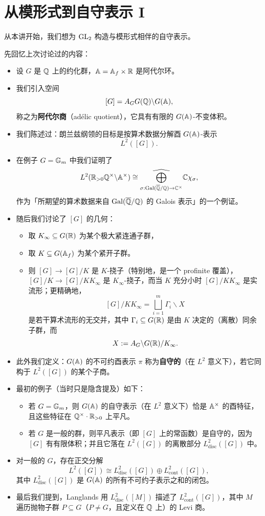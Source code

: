 \chapter{从模形式到自守表示 I}

从本讲开始，我们想为 $\operatorname{GL}_2$ 构造与模形式相伴的自守表示。

先回忆上次讨论过的内容：
\begin{itemize}
\item 设 $G$ 是 $\mathbb{Q}$ 上的约化群，$\mathbb{A}=\mathbb{A}_f\times\mathbb{R}$ 是阿代尔环。
\item 我们引入空间
\[
[G]=A_GG(\mathbb{Q})\backslash G(\mathbb{A}),
\]
称之为\textbf{阿代尔商}（adélic quotient），它具有有限的 $G(\mathbb{A})$-不变体积。
\item 我们陈述过：朗兰兹纲领的目标是按算术数据分解酉 $G(\mathbb{A})$-表示
\[
L^2([G]).
\]
\item 在例子 $G=\mathbb{G}_m$ 中我们证明了
\[
L^2(\mathbb{R}_{>0}\mathbb{Q}^\times\backslash\mathbb{A}^\times)\cong\widehat{\bigoplus_{\sigma:\operatorname{Gal}(\overline{\mathbb{Q}}/\mathbb{Q})\to\mathbb{C}^\times}}\mathbb{C}\chi_\sigma,
\]
作为「所期望的算术数据来自 $\operatorname{Gal}(\overline{\mathbb{Q}}/\mathbb{Q})$ 的 Galois 表示」的一个例证。
\item 随后我们讨论了 $[G]$ 的几何：
\begin{itemize}
\item 取 $K_\infty\subseteq G(\mathbb{R})$ 为某个极大紧连通子群，
\item 取 $K\subseteq G(\mathbb{A}_f)$ 为某个紧开子群。
\item 则 $[G]\to[G]/K$ 是 $K$-挠子（特别地，是一个 profinite 覆盖），$[G]/K\to[G]/KK_\infty$ 是 $K_\infty$-挠子，而当 $K$ 充分小时 $[G]/KK_\infty$ 是实流形；更精确地，
\[
[G]/KK_\infty=\bigsqcup_{i=1}^m\Gamma_i\backslash X
\]
是若干算术流形的无交并，其中 $\Gamma_i\subseteq G(\mathbb{R})$ 是由 $K$ 决定的（离散）同余子群，而
\[
X:=A_G\backslash G(\mathbb{R})/K_\infty.
\]
\end{itemize}
\item 此外我们定义：$G(\mathbb{A})$ 的不可约酉表示 $\pi$ 称为\textbf{自守的}（在 $L^2$ 意义下），若它同构于 $L^2([G])$ 的某个子商。
\item 最初的例子（当时只是隐含提及）如下：
\begin{itemize}
\item 若 $G=\mathbb{G}_m$，则 $G(\mathbb{A})$ 的自守表示（在 $L^2$ 意义下）恰是 $\mathbb{A}^\times$ 的酉特征，且这些特征在 $\mathbb{Q}^\times\cdot\mathbb{R}_{>0}$ 上平凡。
\item 若 $G$ 是一般的群，则平凡表示（即 $[G]$ 上的常函数）是自守的，因为 $[G]$ 有有限体积；并且它落在 $L^2([G])$ 的离散部分 $L^2_{\mathrm{disc}}([G])$ 中。
\end{itemize}
\item 对一般的 $G$，存在正交分解
\[
L^2([G])\cong L^2_{\mathrm{disc}}([G])\oplus L^2_{\mathrm{cont}}([G]),
\]
其中 $L^2_{\mathrm{disc}}([G])$ 是 $G(\mathbb{A})$ 的所有不可约子表示之和的闭包。
\item 最后我们提到，Langlands 用 $L^2_{\mathrm{disc}}([M])$ 描述了 $L^2_{\mathrm{cont}}([G])$，其中 $M$ 遍历抛物子群 $P\subseteq G$（$P\neq G$，且定义在 $\mathbb{Q}$ 上）的 Levi 商。
\end{itemize}

